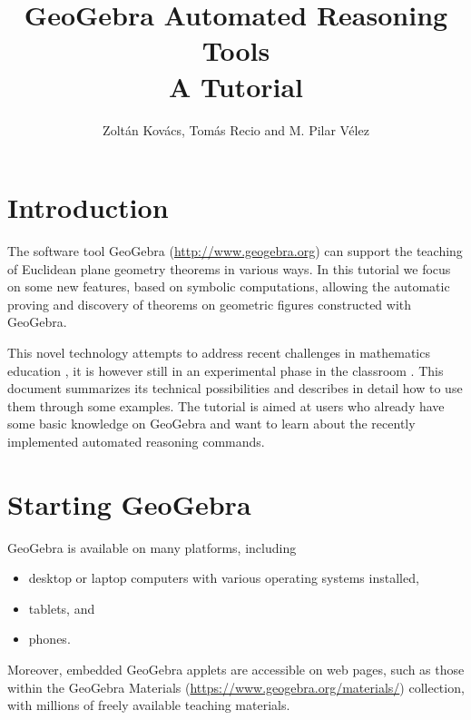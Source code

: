 \documentclass{article}
\title{GeoGebra Automated Reasoning Tools\\ \large A Tutorial}
\author{Zolt\'an Kov\'acs, Tom\'as Recio and M. Pilar V\'elez}
\begin{document}

\maketitle

\section{Introduction}

The software tool GeoGebra (\url{http://www.geogebra.org}) can support the teaching of Euclidean plane geometry theorems in various ways. In this tutorial we focus on some new features, based on symbolic computations,  allowing the automatic proving and discovery of theorems on geometric figures constructed with GeoGebra.

This novel technology attempts to address recent challenges
in mathematics education \cite{HowsonWilson,Davis,SinclairBartoliniBussiDeVilliersOwens,Quaresma,RichardOllerMeavilla},
it is however still in an experimental phase in the classroom \cite{KovacsRecioRichardVelez,Kovacs2017}.
This document summarizes its technical possibilities and describes in detail how to use them through some examples. The tutorial is aimed at users who already
have some basic knowledge on GeoGebra and want to learn about the recently implemented automated reasoning commands.

\section{Starting GeoGebra}

GeoGebra is available on many platforms, including
\begin{itemize}
    \item desktop or laptop computers with various operating systems installed,
    \item tablets, and
    \item phones.
\end{itemize}
Moreover, embedded GeoGebra applets are accessible on web pages, such as those within the GeoGebra Materials (\url{https://www.geogebra.org/materials/}) collection, with millions of freely available teaching materials.
\end{document}
